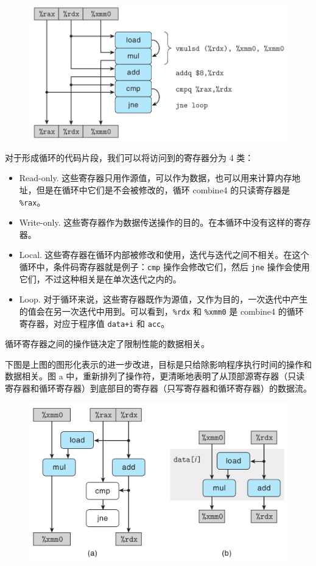 \begin{figure}[!ht]
    \centering
    \includegraphics[scale=0.5]{img/5-2}
\end{figure}

对于形成循环的代码片段，我们可以将访问到的寄存器分为 4 类：
\begin{itemize}
    \item Read-only. 这些寄存器只用作源值，可以作为数据，也可以用来计算内存地址，但是在循环中它们是不会被修改的，循环 combine4 的只读寄存器是 \verb|%rax|。
    \item Write-only. 这些寄存器作为数据传送操作的目的。在本循环中没有这样的寄存器。
    \item Local. 这些寄存器在循环内部被修改和使用，迭代与迭代之间不相关。在这个循环中，条件码寄存器就是例子：\verb|cmp| 操作会修改它们，然后 \verb|jne| 操作会使用它们，不过这种相关是在单次迭代之内的。
    \item Loop. 对于循环来说，这些寄存器既作为源值，又作为目的，一次迭代中产生的值会在另一次迭代中用到。可以看到，\verb|%rdx| 和 \verb|%xmm0| 是 combine4 的循环寄存器，对应于程序值 \verb|data+i| 和 \verb|acc|。
\end{itemize}

循环寄存器之间的操作链决定了限制性能的数据相关。

下图是上图的图形化表示的进一步改进，目标是只给除影响程序执行时间的操作和数据相关。图 a 中，重新排列了操作符，更清晰地表明了从顶部源寄存器（只读寄存器和循环寄存器）到底部目的寄存器（只写寄存器和循环寄存器）的数据流。

\begin{figure}[!ht]
    \centering
    \includegraphics[scale=0.4]{img/5-3}
\end{figure}

